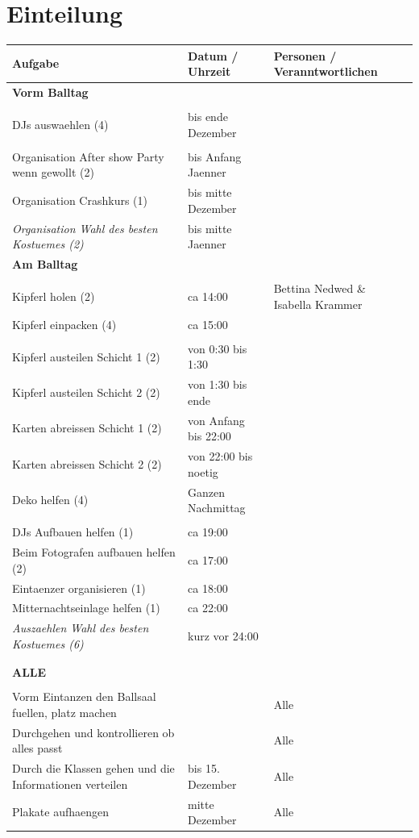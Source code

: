 \documentclass[12pt]{article}
\begin{document}
\section{Einteilung}
  \begin{tabular}{ | p{} | p{} |  p{} |}
    \hline
\textbf{Aufgabe} & \textbf{Datum / Uhrzeit} & \textbf{Personen / Veranntwortlichen} \\ 
    \hline 
    \hline
\textbf{Vorm Balltag} &  &  \\ 
  &  &  \\ \hline
DJs auswaehlen (4) & bis ende Dezember &  \\ 
  &  &  \\ \hline
Organisation After show Party wenn gewollt (2) & bis Anfang Jaenner &  \\ \hline
Organisation Crashkurs (1) & bis mitte Dezember &  \\ \hline
\textit{Organisation Wahl des besten Kostuemes (2)} & bis mitte Jaenner &  \\ \hline
\textbf{Am Balltag} &  &  \\ 
  &  &  \\ \hline
Kipferl holen (2) & ca 14:00 & Bettina Nedwed \& Isabella Krammer \\ \hline
Kipferl einpacken (4) & ca 15:00 &\\ 
  &  &  \\ \hline
Kipferl austeilen Schicht 1 (2) & von 0:30 bis 1:30 &   \\ \hline
Kipferl austeilen Schicht 2 (2) & von 1:30 bis ende &   \\ \hline
Karten abreissen Schicht 1 (2) & von Anfang bis 22:00 &   \\ \hline
Karten abreissen Schicht 2 (2) & von 22:00 bis noetig &   \\ \hline
Deko helfen (4) & Ganzen Nachmittag &  \\
  &  &  \\ \hline
DJs Aufbauen helfen (1) & ca 19:00 &  \\ \hline
Beim Fotografen aufbauen helfen (2) & ca 17:00 &  \\ \hline
Eintaenzer organisieren (1) &  ca 18:00 &  \\ \hline
Mitternachtseinlage helfen (1) & ca 22:00 &  \\ \hline
\textit{Auszaehlen Wahl des besten Kostuemes (6)} & kurz vor 24:00 &  \\ 
  &  &  \\ 
  &  &  \\ \hline
\textbf{ALLE} &  &  \\ 
  &  &  \\ \hline
Vorm Eintanzen den Ballsaal fuellen, platz machen &  & Alle  \\ \hline
Durchgehen und kontrollieren ob alles passt &  & Alle  \\ \hline
Durch die Klassen gehen und die Informationen verteilen & bis 15. Dezember &  Alle\\ \hline
Plakate aufhaengen & mitte Dezember & Alle  \\ \hline

\hline
\end{tabular}
  
\end{document}
